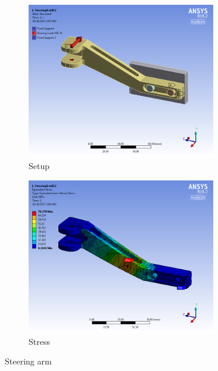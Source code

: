 \documentclass[10pt]{article}
\begin{document}

\begin{figure}[H]
\centering
\begin{subfigure}[b]{.48\textwidth}
\centering
\includegraphics[width=0.9\textwidth]{figures/fea/parts/MS00074-SteeringArm-Setup}
\caption{Setup}
\end{subfigure}
\begin{subfigure}[b]{.48\textwidth}
\centering
\includegraphics[width=0.9\textwidth]{figures/fea/parts/MS00074-SteeringArm-Stress}
\caption{Stress}
\end{subfigure}
\caption{Steering arm}
\label{fig:MS00074-SteeringArm}
\end{figure}
\end{document}
